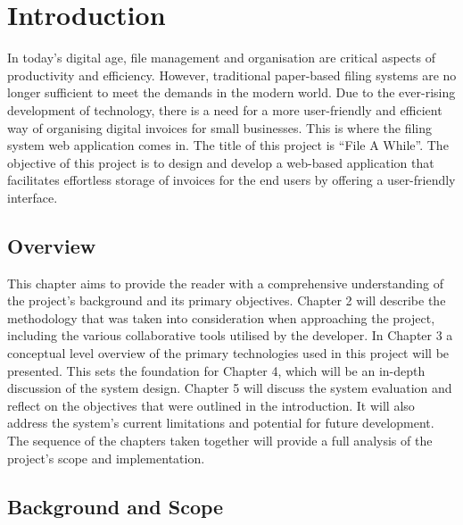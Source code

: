 \chapter{Introduction}	

In today’s digital age, file management and organisation are critical aspects of productivity and efficiency. However, traditional paper-based filing systems are no longer sufficient to meet the demands in the modern world. Due to the ever-rising development of technology, there is a need for a more user-friendly and efficient way of organising digital invoices for small businesses.  This is where the filing system web application comes in. The title of this project is “File A While”. The objective of this project is to design and develop a web-based application that facilitates effortless storage of invoices for the end users by offering a user-friendly interface. 

\section{Overview} 

This chapter aims to provide the reader with a comprehensive understanding of the project’s background and its primary objectives. Chapter 2 will describe the methodology that was taken into consideration when approaching the project, including the various collaborative tools utilised by the developer. In Chapter 3 a conceptual level overview of the primary technologies used in this project will be presented. This sets the foundation for Chapter 4, which will be an in-depth discussion of the system design. Chapter 5 will discuss the system evaluation and reflect on the objectives that were outlined in the introduction. It will also address the system’s current limitations and potential for future development. The sequence of the chapters taken together will provide a full analysis of the project’s scope and implementation.

\section{Background and Scope} 

